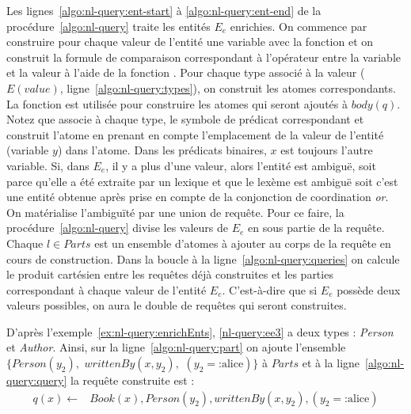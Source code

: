 Les lignes~\ref{algo:nl-query:ent-start} à \ref{algo:nl-query:ent-end} de la procédure~\ref{algo:nl-query} traite les entités $E_e$ enrichies.
On commence par construire pour chaque valeur de l'entité une variable avec la fonction \GetNewVar et on construit la formule de comparaison correspondant à l'opérateur entre la variable et la valeur à l'aide de la fonction \BuildAtomOP.
Pour chaque type associé à la valeur ($E(value)$, ligne~\ref{algo:nl-query:types}), on construit les atomes correspondants.
La fonction \BuildAtom est utilisée pour construire les atomes qui seront ajoutés à $body(q)$.
Notez que \BuildAtom associe à chaque type, le symbole de prédicat correspondant et construit l'atome en prenant en compte l'emplacement de la valeur de l'entité (variable $y$) dans l'atome.
Dans les prédicats binaires, $x$ est toujours l'autre variable.
Si, dans $E_e$, il y a plus d'une valeur, alors l'entité est ambiguë, soit parce qu'elle a été extraite par un lexique et que le lexème est ambiguë soit c'est une entité obtenue après prise en compte de la conjonction de coordination \textit{or}.
On matérialise l'ambiguïté par une union de requête.
Pour ce faire, la procédure~\ref{algo:nl-query} divise les valeurs de $E_e$ en sous partie de la requête.
Chaque $l \in Parts$ est un ensemble d'atomes à ajouter au corps de la requête en cours de construction.
Dans la boucle à la ligne~\ref{algo:nl-query:queries} on calcule le produit cartésien entre les requêtes déjà construites et les parties correspondant à chaque valeur de l'entité $E_e$.
C'est-à-dire que si $E_e$ possède deux valeurs possibles, on aura le double de requêtes qui seront construites.

D'après l'exemple~\ref{ex:nl-query:enrichEnts}, \ref{nl-query:ee3} a deux types : \emph{Person} et \emph{Author}.
Ainsi, sur la ligne~\ref{algo:nl-query:part} on ajoute l'ensemble $\{ Person(y_2),$ $writtenBy(x, y_2),$ $(y_2= \text{:alice}) \}$ à $Parts$ et à la ligne~\ref{algo:nl-query:query} la requête construite est :
\begin{equation*}
    \begin{split}
        q(x) \leftarrow & Book(x), Person(y_2), writtenBy(x, y_2), (y_2= \text{:alice})
    \end{split}
\end{equation*}

